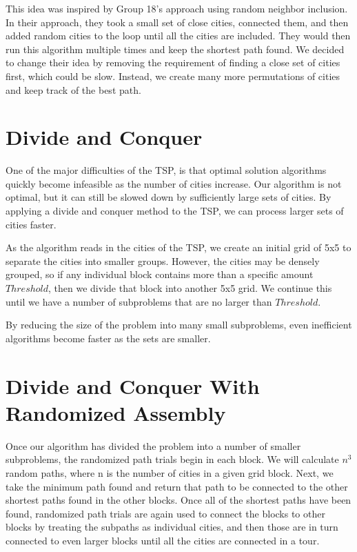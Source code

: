\documentclass[12pt,letterpaper]{article}
\begin{document}
This idea was inspired by Group 18's approach using random neighbor inclusion. In their approach, they took a small set of close cities, connected them, and then added random cities to the loop until all the cities are included. They would then run this algorithm multiple times and keep the shortest path found. We decided to change their idea by removing the requirement of finding a close set of cities first, which could be slow. Instead, we create many more permutations of cities and keep track of the best path.

\section*{Divide and Conquer}

One of the major difficulties of the TSP, is that optimal solution algorithms quickly become infeasible as the number of cities increase. Our algorithm is not optimal, but it can still be slowed down by sufficiently large sets of cities. By applying a divide and conquer method to the TSP, we can process larger sets of cities faster.

As the algorithm reads in the cities of the TSP, we create an initial grid of 5x5 to separate the cities into smaller groups. However, the cities may be densely grouped, so if any individual block contains more than a specific amount $Threshold$, then we divide that block into another 5x5 grid. We continue this until we have a number of subproblems that are no larger than $Threshold$.

By reducing the size of the problem into many small subproblems, even inefficient algorithms become faster as the sets are smaller. 

\section*{Divide and Conquer With Randomized Assembly}

Once our algorithm has divided the problem into a number of smaller subproblems, the randomized path trials begin in each block. We will calculate $n^3$ random paths, where n is the number of cities in a given grid block. Next, we take the minimum path found and return that path to be connected to the other shortest paths found in the other blocks. Once all of the shortest paths have been found, randomized path trials are again used to connect the blocks to other blocks by treating the subpaths as individual cities, and then those are in turn connected to even larger blocks until all the cities are connected in a tour.
\end{document}
